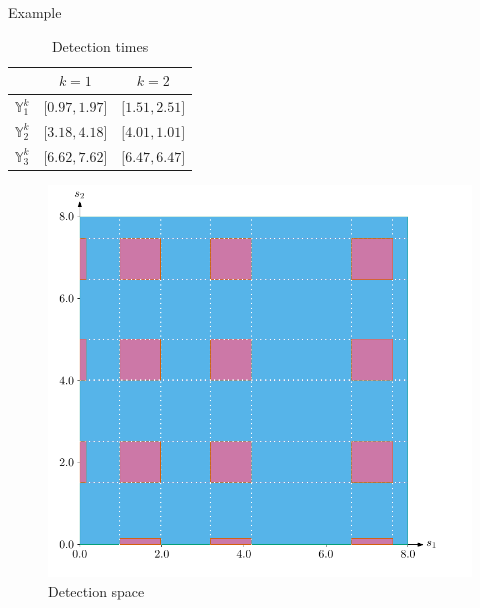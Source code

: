 \documentclass{beamer}
\begin{document}
            \begin{frame}{Example}
                \begin{minipage}{0.45\textwidth}
                    \begin{table}
                        \begin{tabular}{@{} rcc @{}}
                            \toprule
                            & $k=1$ & $k=2$ \\
                            \midrule
                            $\mathbb{Y}_1^k$ & $\lbrack0.97, 1.97\rbrack$ & $\lbrack1.51, 2.51\rbrack$  \\
                            $\mathbb{Y}_2^k$ & $\lbrack3.18, 4.18\rbrack$ & $\lbrack4.01, 1.01\rbrack$ \\
                            $\mathbb{Y}_3^k$ & $\lbrack6.62, 7.62\rbrack$ & $\lbrack6.47, 6.47\rbrack$ \\
                            \bottomrule
                        \end{tabular}
                        \caption{Detection times}
                    \end{table}
                \end{minipage}
                \hfill
                \begin{minipage}{0.5\textwidth}
                    \begin{figure}
                        \includegraphics[height=0.7\textheight]{imgs/detection_space}
                        \caption{Detection space}
                    \end{figure}
                \end{minipage}
            \end{frame}
\end{document}

